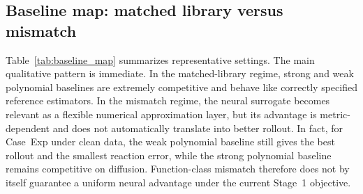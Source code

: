 \documentclass[preprint,12pt]{elsarticle}
\begin{document}
\subsection{Baseline map: matched library versus mismatch}

Table~\ref{tab:baseline_map} summarizes representative settings. The main qualitative pattern is immediate. In the matched-library regime, strong and weak polynomial baselines are extremely competitive and behave like correctly specified reference estimators. In the mismatch regime, the neural surrogate becomes relevant as a flexible numerical approximation layer, but its advantage is metric-dependent and does not automatically translate into better rollout. In fact, for Case~Exp under clean data, the weak polynomial baseline still gives the best rollout and the smallest reaction error, while the strong polynomial baseline remains competitive on diffusion. Function-class mismatch therefore does not by itself guarantee a uniform neural advantage under the current Stage~1 objective.
\end{document}
